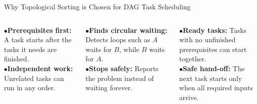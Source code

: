 \iffalse
\begin{frame}[t]{Why Topological Sorting is Chosen for DAG Task Scheduling}
\vspace{-0.55em}

\begin{columns}[T]
\begin{column}{0.32\textwidth}
  \begin{tcolorbox}[
    enhanced, arc=2.5pt, colframe=lavenderDark!85, colback=lavenderLight!35,
    title={\scriptsize\bfseries\color{white}\faProjectDiagram\; 1. Task Dependencies},
    boxrule=0.55pt, left=3pt, right=3pt, top=1.2pt, bottom=1.2pt
  ]
  \fontsize{4.6}{5.5}\selectfont
  $\bullet$\;\textbf{Prerequisites first:} A task starts after the tasks it needs are finished.\\
  $\bullet$\;\textbf{Independent work:} Unrelated tasks can run in any order.
  \end{tcolorbox}
\end{column}

\begin{column}{0.34\textwidth}
  \begin{tcolorbox}[
    enhanced, arc=2.5pt, colframe=prismTeal!85!black, colback=prismMint!35,
    title={\scriptsize\bfseries\color{white}\faExclamationTriangle\; 2. Finds Waiting Loops},
    boxrule=0.55pt, left=3pt, right=3pt, top=1.2pt, bottom=1.2pt
  ]
  \fontsize{4.6}{5.5}\selectfont
  $\bullet$\;\textbf{Finds circular waiting:} Detects loops such as $A$ waits for $B$, while $B$ waits for $A$.\\
  $\bullet$\;\textbf{Stops safely:} Reports the problem instead of waiting forever.
  \end{tcolorbox}
\end{column}

\begin{column}{0.32\textwidth}
  \begin{tcolorbox}[
    enhanced, arc=2.5pt, colframe=lavenderMedium!90, colback=lavenderLight!35,
    title={\scriptsize\bfseries\color{white}\faCogs\; 3. Runs Work in Parallel},
    boxrule=0.55pt, left=3pt, right=3pt, top=1.2pt, bottom=1.2pt
  ]
  \fontsize{4.6}{5.5}\selectfont
  $\bullet$\;\textbf{Ready tasks:} Tasks with no unfinished prerequisites can start together.\\
  $\bullet$\;\textbf{Safe hand-off:} The next task starts only when all required inputs arrive.
  \end{tcolorbox}
\end{column}
\end{columns}


\end{frame}
